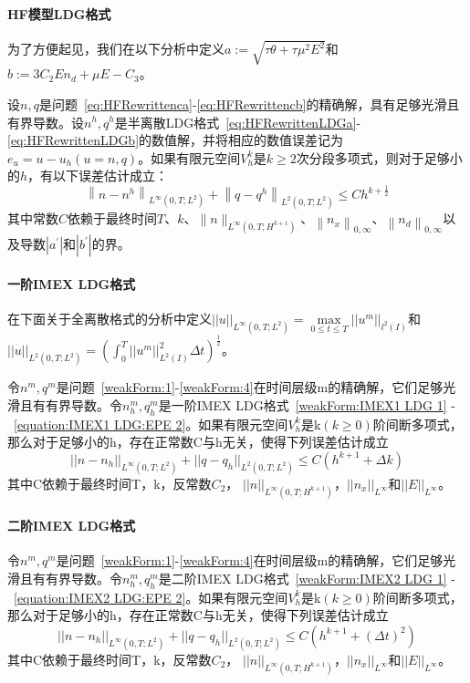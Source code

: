 \paragraph{HF模型LDG格式}
为了方便起见，我们在以下分析中定义$a:=\sqrt{\tau \theta+\tau \mu^{2} E^{2}}$和$b:=3 C_{2} E n_{d}+\mu E-C_{3}$。
\begin{theorem}
    设$n, q$是问题~\eqref{eq:HFRewrittenca}-\eqref{eq:HFRewrittencb}的精确解，具有足够光滑且有界导数。设$n^{h}, q^{h}$是半离散LDG格式~\eqref{eq:HFRewrittenLDGa}-\eqref{eq:HFRewrittenLDGb}的数值解，并将相应的数值误差记为$e_{u}=u-u_{h}(u=n, q)$。如果有限元空间$V_{h}^{k}$是$k \geq 2$次分段多项式，则对于足够小的$h$，有以下误差估计成立：
    $$
        \left\|n-n^{h}\right\|_{L^{\infty}\left(0, T ; L^{2}\right)}+\left\|q-q^{h}\right\|_{L^{2}\left(0, T ; L^{2}\right)} \leq C h^{k+\frac{1}{2}}
    $$
    其中常数$C$依赖于最终时间$T$、$k$、$\|n\|_{L^{\infty}\left(0, T ; H^{k+1}\right)}$、$\left\|n_{x}\right\|_{0, \infty}$、$\left\|n_{d}\right\|_{0, \infty}$以及导数$\left|a^{\prime}\right|$和$\left|b^{\prime}\right|$的界。
\end{theorem}
\paragraph{一阶IMEX LDG格式}
在下面关于全离散格式的分析中定义$||u||_{L^{\infty}(0,T;L^2)}  = \max \limits_{0 \leq t \leq T}||u^m||_{l^2(I)}$和$||u||_{L^2(0,T;L^2)} = (\int_{0}^{T}||u^m||_{L^2(I)}^2\Delta t)^{\frac{1}{2}}$。
\begin{theorem}
    令$n^m,q^m$是问题~\eqref{weakForm:1}-\eqref{weakForm:4}在时间层级m的精确解，它们足够光滑且有有界导数。令$n_h^m,q_h^m$是一阶IMEX LDG格式~\eqref{weakForm:IMEX1 LDG 1} - ~\eqref{equation:IMEX1 LDG:EPE 2}。如果有限元空间$V_h^k$是k$(k\geq  0)$阶间断多项式，那么对于足够小的h，存在正常数C与h无关，使得下列误差估计成立
    \begin{equation}
        ||n-n_h||_{L^{\infty}(0,T;L^2)} + ||q - q_h||_{L^2(0,T;L^2)} \leq C(h^{k+1} + \Delta k)
    \end{equation}
    其中C依赖于最终时间T，k，反常数$C_2$， $||n||_{L^{\infty}(0,T;H^{k+1})}$，$||n_x||_{L^{\infty}}$和$||E||_{L^{\infty}}$。
\end{theorem}

\paragraph{二阶IMEX LDG格式}
\begin{theorem}
    令$n^m,q^m$是问题~\eqref{weakForm:1}-\eqref{weakForm:4}在时间层级m的精确解，它们足够光滑且有有界导数。令$n_h^m,q_h^m$是二阶IMEX LDG格式~\eqref{weakForm:IMEX2 LDG 1} - ~\eqref{equation:IMEX2 LDG:EPE 2}。如果有限元空间$V_h^k$是k$(k\geq  0)$阶间断多项式，那么对于足够小的h，存在正常数C与h无关，使得下列误差估计成立
    \begin{equation}
        ||n-n_h||_{L^{\infty}(0,T;L^2)} + ||q - q_h||_{L^2(0,T;L^2)} \leq C(h^{k+1} + (\Delta t)^2)
    \end{equation}
    其中C依赖于最终时间T，k，反常数$C_2$， $||n||_{L^{\infty}(0,T;H^{k+1})}$，$||n_x||_{L^{\infty}}$和$||E||_{L^{\infty}}$。
\end{theorem}

